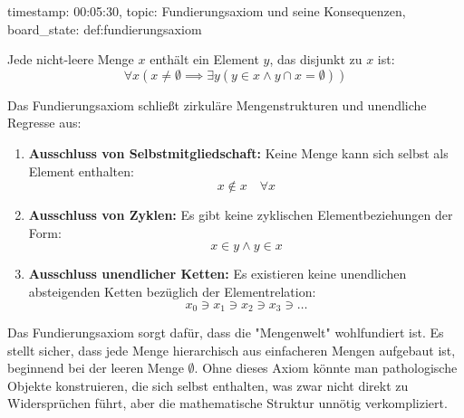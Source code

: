 \begin{ai-global-state-checkpoint-invisible-content}
timestamp: 00:05:30, topic: Fundierungsaxiom und seine Konsequenzen, board_state: def:fundierungsaxiom
\end{ai-global-state-checkpoint-invisible-content}

\begin{math-stroke}
\begin{theorem}\label{ax:fundierung}
Jede nicht-leere Menge $x$ enthält ein Element $y$, das disjunkt zu $x$ ist:
\begin{equation}
\label{eq:fundierungsaxiom}
\forall x \left( x \neq \emptyset \implies \exists y \left( y \in x \land y \cap x = \emptyset \right) \right)
\end{equation}
\end{theorem}

\begin{explanation-of-steps}
Das Fundierungsaxiom schließt zirkuläre Mengenstrukturen und unendliche Regresse aus:
\begin{enumerate}[label=\textbf{(\roman*)}]
    \item \textbf{Ausschluss von Selbstmitgliedschaft:} Keine Menge kann sich selbst als Element enthalten:
    \[
    x \notin x \quad \forall x
    \]
    \item \textbf{Ausschluss von Zyklen:} Es gibt keine zyklischen Elementbeziehungen der Form:
    \[
    x \in y \land y \in x
    \]
    \item \textbf{Ausschluss unendlicher Ketten:} Es existieren keine unendlichen absteigenden Ketten bezüglich der Elementrelation:
    \[
    x_0 \ni x_1 \ni x_2 \ni x_3 \ni \dots
    \]
\end{enumerate}
\end{explanation-of-steps}
\end{math-stroke}

\begin{didactic-insight}
Das Fundierungsaxiom sorgt dafür, dass die "Mengenwelt" wohlfundiert ist. Es stellt sicher, dass jede Menge hierarchisch aus einfacheren Mengen aufgebaut ist, beginnend bei der leeren Menge $\emptyset$. Ohne dieses Axiom könnte man pathologische Objekte konstruieren, die sich selbst enthalten, was zwar nicht direkt zu Widersprüchen führt, aber die mathematische Struktur unnötig verkompliziert.
\end{didactic-insight}

